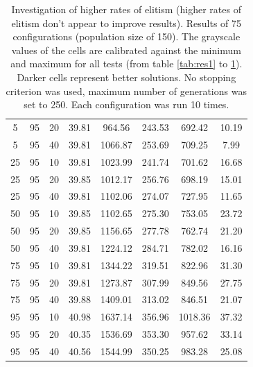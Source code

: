 \begin{table}[H]
\begin{tabular}{ccc|c|c|c|c|c}
5 & 95 & 20 & \cellcolor{gray!50}39.81 & \cellcolor{gray!11}964.56 & \cellcolor{gray!1}243.53 & \cellcolor{gray!40}692.42 & 10.19\\
5 & 95 & 40 & \cellcolor{gray!50}39.81 & \cellcolor{gray!1}1066.87 & \cellcolor{gray!1}253.69 & \cellcolor{gray!35}709.25 & 7.99\\
25 & 95 & 10 & \cellcolor{gray!50}39.81 & \cellcolor{gray!1}1023.99 & \cellcolor{gray!1}241.74 & \cellcolor{gray!38}701.62 & 16.68\\
25 & 95 & 20 & \cellcolor{gray!50}39.85 & \cellcolor{gray!3}1012.17 & \cellcolor{gray!1}256.76 & \cellcolor{gray!39}698.19 & 15.01\\
25 & 95 & 40 & \cellcolor{gray!50}39.81 & \cellcolor{gray!1}1102.06 & \cellcolor{gray!1}274.07 & \cellcolor{gray!30}727.95 & 11.65\\
50 & 95 & 10 & \cellcolor{gray!50}39.85 & \cellcolor{gray!1}1102.65 & \cellcolor{gray!1}275.30 & \cellcolor{gray!22}753.05 & 23.72\\
50 & 95 & 20 & \cellcolor{gray!50}39.85 & \cellcolor{gray!1}1156.65 & \cellcolor{gray!1}277.78 & \cellcolor{gray!19}762.74 & 21.20\\
50 & 95 & 40 & \cellcolor{gray!50}39.81 & \cellcolor{gray!1}1224.12 & \cellcolor{gray!1}284.71 & \cellcolor{gray!13}782.02 & 16.16\\
75 & 95 & 10 & \cellcolor{gray!50}39.81 & \cellcolor{gray!1}1344.22 & \cellcolor{gray!1}319.51 & \cellcolor{gray!1}822.96 & 31.30\\
75 & 95 & 20 & \cellcolor{gray!50}39.81 & \cellcolor{gray!1}1273.87 & \cellcolor{gray!1}307.99 & \cellcolor{gray!1}849.56 & 27.75\\
75 & 95 & 40 & \cellcolor{gray!50}39.88 & \cellcolor{gray!1}1409.01 & \cellcolor{gray!1}313.02 & \cellcolor{gray!1}846.51 & 21.07\\
95 & 95 & 10 & \cellcolor{gray!39}40.98 & \cellcolor{gray!1}1637.14 & \cellcolor{gray!1}356.96 & \cellcolor{gray!1}1018.36 & 37.32\\
95 & 95 & 20 & \cellcolor{gray!45}40.35 & \cellcolor{gray!1}1536.69 & \cellcolor{gray!1}353.30 & \cellcolor{gray!1}957.62 & 33.14\\
95 & 95 & 40 & \cellcolor{gray!43}40.56 & \cellcolor{gray!1}1544.99 & \cellcolor{gray!1}350.25 & \cellcolor{gray!1}983.28 & 25.08
\end{tabular}
\caption{Investigation of higher rates of elitism (higher rates of elitism don't appear to improve results). Results of 75 configurations (population size of 150). The grayscale values of the cells are calibrated against the minimum and maximum for all tests (from table \ref{tab:res1} to \ref{tab:res5}). Darker cells represent better solutions. No stopping criterion was used, maximum number of generations was set to 250. Each configuration was run 10 times.}
\label{tab:res5}
\end{table}

